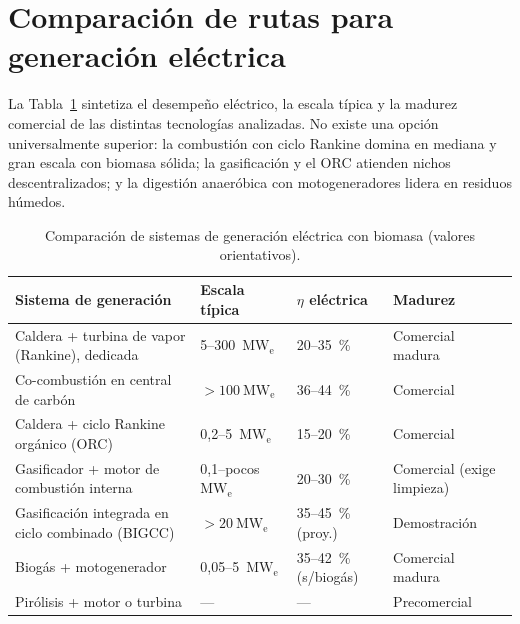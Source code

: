 \section{Comparación de rutas para generación eléctrica}
\label{sec:comparacion_rutas}

La Tabla~\ref{tab:comparacion_rutas} sintetiza el desempeño eléctrico, la escala típica y la madurez comercial de las distintas tecnologías analizadas. No existe una opción universalmente superior: la combustión con ciclo Rankine domina en mediana y gran escala con biomasa sólida; la gasificación y el ORC atienden nichos descentralizados; y la digestión anaeróbica con motogeneradores lidera en residuos húmedos.

\begin{table}[htbp]
\centering
\caption{Comparación de sistemas de generación eléctrica con biomasa (valores orientativos).}
\label{tab:comparacion_rutas}
\begin{tabularx}{\textwidth}{@{}X l l l@{}}
\toprule
\textbf{Sistema de generación} & \textbf{Escala típica} & \textbf{$\eta$ eléctrica} & \textbf{Madurez} \\
\midrule
Caldera + turbina de vapor (Rankine), dedicada & 5--300~$\mathrm{MW_e}$ & 20--35~\% & Comercial madura \\
Co-combustión en central de carbón & $>100~\mathrm{MW_e}$ & 36--44~\% \cite{irena2013cofiring} & Comercial \\
Caldera + ciclo Rankine orgánico (ORC) & 0,2--5~$\mathrm{MW_e}$ & 15--20~\% & Comercial \\
Gasificador + motor de combustión interna & 0,1--pocos $\mathrm{MW_e}$ & 20--30~\% & Comercial (exige limpieza) \\
Gasificación integrada en ciclo combinado (BIGCC) & $>20~\mathrm{MW_e}$ & 35--45~\% (proy.) & Demostración \\
Biogás + motogenerador & 0,05--5~$\mathrm{MW_e}$ & 35--42~\% (s/biogás) & Comercial madura \\
Pirólisis + motor o turbina & --- & --- & Precomercial \\
\bottomrule
\end{tabularx}
\end{table}
